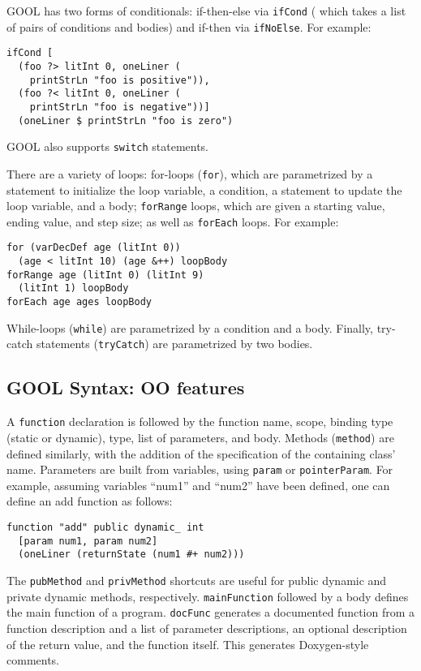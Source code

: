 \documentclass[sigplan,review,anonymous,prologue,dvipsnames]{acmart}
\begin{document}
GOOL has two forms of conditionals: if-then-else via \verb|ifCond| (
which takes a list of pairs of conditions and bodies) and
if-then via \verb|ifNoElse|.  For example:
\begin{lstlisting}
ifCond [
  (foo ?> litInt 0, oneLiner (
    printStrLn "foo is positive")),
  (foo ?< litInt 0, oneLiner (
    printStrLn "foo is negative"))] 
  (oneLiner $ printStrLn "foo is zero")
\end{lstlisting}
GOOL also supports \verb|switch| statements. 

There are a variety of loops: for-loops (\verb|for|), which are
parametrized by a statement to 
initialize the loop variable, a condition, a statement to update the loop 
variable, and a body; \verb|forRange| loops, which are given a 
starting value, ending value, and step size; as well as \verb|forEach| 
loops. 
For example:
\begin{lstlisting}
for (varDecDef age (litInt 0)) 
  (age < litInt 10) (age &++) loopBody
forRange age (litInt 0) (litInt 9) 
  (litInt 1) loopBody
forEach age ages loopBody
\end{lstlisting}
While-loops (\verb|while|) are parametrized by a condition and a body. Finally,
try-catch statements (\verb|tryCatch|) are parametrized by two bodies.

\subsection{GOOL Syntax: OO features}

A \verb|function| declaration is followed by the function 
name, scope, binding type (static or dynamic), type, list of parameters, and 
body. Methods (\verb|method|) are defined similarly, with the addition of the
specification of the containing class' name.  Parameters are built from
variables, using \verb|param| or \verb|pointerParam|. For example, assuming
variables ``num1'' and ``num2'' have been defined, one can define an
\textsf{add} function as follows:
\begin{lstlisting}
function "add" public dynamic_ int 
  [param num1, param num2] 
  (oneLiner (returnState (num1 #+ num2)))
\end{lstlisting}
The  \verb|pubMethod| and \verb|privMethod| shortcuts are useful for public 
dynamic and private dynamic methods, respectively. \verb|mainFunction| 
followed by a body defines the main function of a program. \verb|docFunc|
generates a documented function from a function description and
a list of parameter descriptions, an optional description of the return
value, and the function itself.  This generates Doxygen-style comments.
\end{document}
